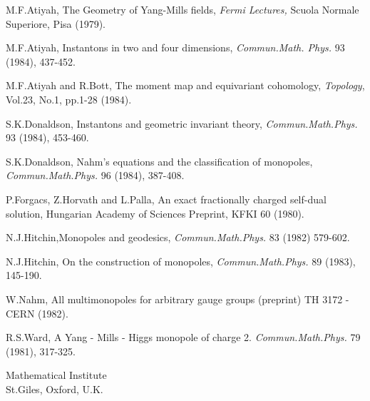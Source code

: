 \begin{thebibliography}{}
 M.F.\@ Atiyah, The Geometry of Yang-Mills fields,
{\em Fermi Lectures,} Scuola Normale Superiore, Pisa (1979).

 M.F.\@ Atiyah, Instantons in two and four
dimensions, {\em Commun.\@ Math. Phys.} 93 (1984), 437-452.

 M.F.\@ Atiyah and R.\@ Bott, The moment map and
equivariant cohomology, {\em Topology}, Vol.\@ 23, No.\@ 1, pp.\@ 1-28
(1984).

 S.K.\@ Donaldson, Instantons and geometric
invariant theory, {\em Commun.\@ Math.\@ Phys.} 93 (1984), 453-460.

 S.K.\@ Donaldson, Nahm's equations and the
classification of monopoles, {\em Commun.\@ Math.\@ Phys.} 96 (1984),
387-408.

 P.\@ Forgacs, Z.\@ Horvath and L.\@ Palla, An
exact fractionally charged self-dual solution, Hungarian Academy of
Sciences Preprint, KFKI 60 (1980). 

 N.J.\@ Hitchin,\pageoriginale Monopoles and
geodesics, {\em Commun.\@ Math.\@ Phys.} 83 (1982) 579-602.

 N.J.\@ Hitchin, On the construction of monopoles,
{\em Commun.\@ Math.\@ Phys.} 89 (1983), 145-190.

 W.\@ Nahm, All multimonopoles for arbitrary gauge
groups (preprint) TH 3172 - CERN (1982).

 R.S.\@ Ward, A Yang - Mills - Higgs monopole of
charge 2. {\em Commun.\@ Math.\@ Phys.} 79 (1981), 317-325.  
\end{thebibliography}

\vskip 1cm

\noindent
Mathematical Institute\\
St.\@ Giles, Oxford, U.K.


